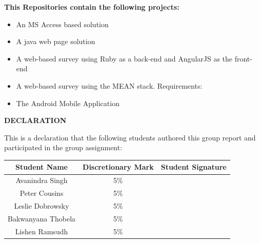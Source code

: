 \documentclass[12pt]{witseiepaper}
\begin{document}
\textbf{This Repositories contain the following projects:}
\begin{itemize}
\item An MS Access based solution
\item A java web page solution
\item A web-based survey using Ruby as a back-end and AngularJS as the front-end
\item A web-based survey using the MEAN stack. Requirements:
\item The Android Mobile Application
\end{itemize}


\clearpage %

 \thispagestyle{empty}\pagestyle{empty}
 \begin{center}
  \textsc{\bfseries DECLARATION} \\ [1.0cm]
 \end{center}

This is a declaration that the following students authored this group report and participated in the group assignment: \\

\begin{table}[htb] \label{tbl:DEC} 
  \begin{center}
    \begin{tabular}
       {|c|c|c|} %
      \hline \textbf{Student Name} & \textbf{Discretionary Mark} & \textbf{Student Signature} \\[5ex]
      \hline Avanindra Singh &  5\% &   \\[5ex]
      \hline Peter Cousins & 5\% & \\[5ex]
      \hline Leslie Dobrowsky & 5\%& \\[5ex]
      \hline Bakwanyana Thobela & 5\% & \\[5ex]
      \hline Lishen Ramsudh & 5\% & \\[5ex]
      \hline 
    \end{tabular}
  \end{center}
\end{table}
\end{document}
